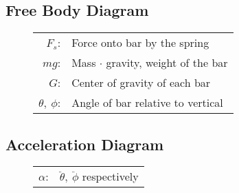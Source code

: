 \documentclass[12pt]{report}
\begin{document}
\begin{flushleft}
\section{Free Body Diagram}
\begin{figure}[ht]
   \begin{minipage}[c]{.25\textwidth}
      
   \end{minipage}%
   \begin{minipage}[c]{.5\textwidth}
     \hfill
     \begin{tabular}{rl}
     $F_s$:&Force onto bar by the spring\\
     $mg$:&Mass $\cdot$ gravity, weight of the bar\\
     $G$:&Center of gravity of each bar\\
     $\theta,~\phi$:& Angle of bar relative to vertical\\
   \end{tabular}
   \end{minipage}%
  \begin{minipage}[c]{.25\textwidth}
    \vspace{2.8ex}
    \hspace{2ex}
     
  \end{minipage}
\end{figure}

\subsection*{Acceleration Diagram}
\begin{figure}[ht]
   \begin{minipage}[c]{.25\textwidth}
      
   \end{minipage}%
   \begin{minipage}[c]{.5\textwidth}
     \begin{tabular}{rl}
     $\alpha$:& $\ddot{\theta},~\ddot{\phi}$ respectively\\
   \end{tabular}
   \end{minipage}%
  \begin{minipage}[c]{.25\textwidth}
    \hspace{2ex}
     
  \end{minipage}
\end{figure}


\end{flushleft}
\end{document}
